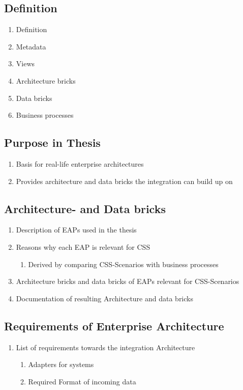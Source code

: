 \documentclass[
     12pt,         %
     a4paper,      %
     BCOR10mm,     %
     DIV14,        %
     ]{scrreprt}
\begin{document}
\subsection{Definition}
\begin{enumerate}
     \item Definition
     \item Metadata
     \item Views
     \item Architecture bricks
     \item Data bricks
     \item Business processes
\end{enumerate}

\subsection{Purpose in Thesis}
\begin{enumerate}
     \item Basis for real-life enterprise architectures
     \item Provides architecture and data bricks the integration can build up on
\end{enumerate}

\subsection{Architecture- and Data bricks}
\begin{enumerate}
     \item Description of EAPs used in the thesis
     \item Reasons why each EAP is relevant for CSS
           \begin{enumerate}
                \item Derived by comparing CSS-Scenarios with business processes
           \end{enumerate}
     \item Architecture bricks and data bricks of EAPs relevant for CSS-Scenarios
     \item Documentation of resulting Architecture and data bricks
\end{enumerate}

\subsection{Requirements of Enterprise Architecture}
\begin{enumerate}
     \item List of requirements towards the integration Architecture
           \begin{enumerate}
                \item Adapters for systems
                \item Required Format of incoming data
           \end{enumerate}
\end{enumerate}
\end{document}
